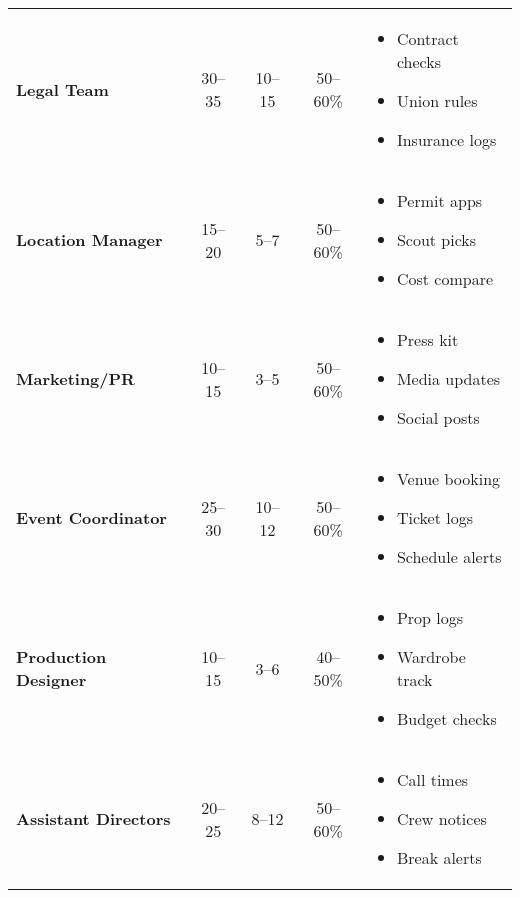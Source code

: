 \documentclass[11pt]{article}
\begin{document}
\begin{table}[H]
{\begin{tabular}{@{}l c c c p{4cm}@{}}
\textbf{Legal Team}
  & 30--35
  & 10--15
  & 50--60\%
  & \begin{itemize}
      \item Contract checks
      \item Union rules
      \item Insurance logs
    \end{itemize} \\

\textbf{Location Manager}
  & 15--20
  & 5--7
  & 50--60\%
  & \begin{itemize}
      \item Permit apps
      \item Scout picks
      \item Cost compare
    \end{itemize} \\

\textbf{Marketing/PR}
  & 10--15
  & 3--5
  & 50--60\%
  & \begin{itemize}
      \item Press kit
      \item Media updates
      \item Social posts
    \end{itemize} \\

\textbf{Event Coordinator}
  & 25--30
  & 10--12
  & 50--60\%
  & \begin{itemize}
      \item Venue booking
      \item Ticket logs
      \item Schedule alerts
    \end{itemize} \\

\textbf{Production Designer}
  & 10--15
  & 3--6
  & 40--50\%
  & \begin{itemize}
      \item Prop logs
      \item Wardrobe track
      \item Budget checks
    \end{itemize} \\

\textbf{Assistant Directors}
  & 20--25
  & 8--12
  & 50--60\%
  & \begin{itemize}
      \item Call times
      \item Crew notices
      \item Break alerts
    \end{itemize} \\


\end{tabular}}
\end{table}
\end{document}
